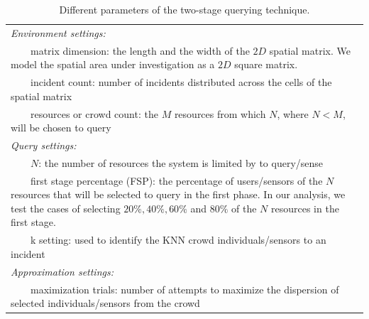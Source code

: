 \documentclass{acm_proc_article-sp}
\newcommand{\tabitem}{~~\llap{\textbullet}~~}
\begin{document}
\begin{table}{}
\centering
\begin{tabulary}{0.5\textwidth}{|L|}
\hline
\textit{Environment settings: }\\
\tabitem matrix dimension: the length and
the width of the $2D$ spatial matrix. We model the spatial area under investigation as a $2D$ square matrix.\\
\tabitem incident count: number of incidents distributed across the cells of the spatial matrix\\
\tabitem resources or crowd count: the $M$ resources from which $N$, where $N < M$, will be chosen to query\\
\hline
\textit{Query settings:}\\
\tabitem $N$: the number of resources the system is limited by to query/sense \\
\tabitem first stage percentage (FSP): the percentage of users/sensors of the $N$ resources that will be selected to query in the first phase. In our analysis, we test the cases of selecting $20\%, 40\%, 60\%$ and $80\%$ of the $N$ resources in the first stage.\\
\tabitem k setting: used to identify the KNN crowd individuals/sensors to an incident\\
\hline
\textit{Approximation settings: }\\
\tabitem maximization trials: number of attempts to maximize the dispersion of selected individuals/sensors from the crowd\\
\hline
\end{tabulary}
\caption{Different parameters of the two-stage querying technique.}
\label{table:systemParameters}
\end{table}
\end{document}
